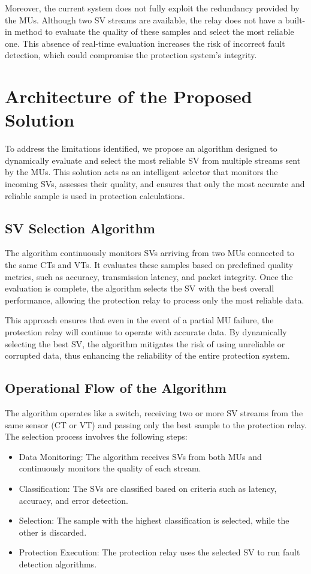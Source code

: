 Moreover, the current system does not fully exploit the redundancy provided by the MUs. Although two SV streams are available, the relay does not have a built-in method to evaluate the quality of these samples and select the most reliable one. This absence of real-time evaluation increases the risk of incorrect fault detection, which could compromise the protection system's integrity.

\section{Architecture of the Proposed Solution}

To address the limitations identified, we propose an algorithm designed to dynamically evaluate and select the most reliable SV from multiple streams sent by the MUs. This solution acts as an intelligent selector that monitors the incoming SVs, assesses their quality, and ensures that only the most accurate and reliable sample is used in protection calculations.

\subsection{SV Selection Algorithm}

The algorithm continuously monitors SVs arriving from two MUs connected to the same CTs and VTs. It evaluates these samples based on predefined quality metrics, such as accuracy, transmission latency, and packet integrity. Once the evaluation is complete, the algorithm selects the SV with the best overall performance, allowing the protection relay to process only the most reliable data.

This approach ensures that even in the event of a partial MU failure, the protection relay will continue to operate with accurate data. By dynamically selecting the best SV, the algorithm mitigates the risk of using unreliable or corrupted data, thus enhancing the reliability of the entire protection system.

\subsection{Operational Flow of the Algorithm}

The algorithm operates like a switch, receiving two or more SV streams from the same sensor (CT or VT) and passing only the best sample to the protection relay. The selection process involves the following steps:
\begin{itemize}
	\item Data Monitoring: The algorithm receives SVs from both MUs and continuously monitors the quality of each stream.
	\item Classification: The SVs are classified based on criteria such as latency, accuracy, and error detection.
	\item Selection: The sample with the highest classification is selected, while the other is discarded.
	\item Protection Execution: The protection relay uses the selected SV to run fault detection algorithms.
\end{itemize}

